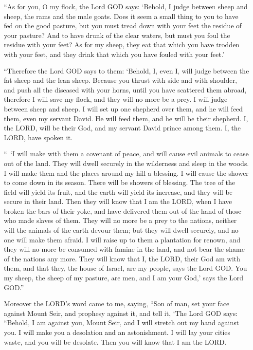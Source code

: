 \myverse{}“As for you, O my flock, the Lord GOD says: ‘Behold, I judge
between sheep and sheep, the rams and the male goats.
\myverse{}Does it seem a small thing to you to have fed on the good pasture, but you
must tread down with your feet the residue of your pasture? And to have drunk of the clear waters, but
must you foul the residue with your feet?
\myverse{}As for my sheep, they eat that which you have trodden with your feet, and
they drink that which you have fouled with your feet.’

\myverse{}“Therefore the Lord GOD says to them: ‘Behold, I, even I, will
judge between the fat sheep and the lean sheep.
\myverse{}Because you thrust with side and with shoulder, and push all the diseased
with your horns, until you have scattered them abroad,
\myverse{}therefore I will save my flock, and they will no more be a prey. I will judge
between sheep and sheep.
\myverse{}I will set up one shepherd over them, and he will feed them, even my servant
David. He will feed them, and he will be their shepherd.
\myverse{}I, the LORD, will be their God, and my servant David prince among them. I,
the LORD, have spoken it.

\myverse{}“ ‘I will make with them a covenant of peace, and will cause
evil animals to cease out of the land. They will dwell securely in the wilderness and sleep in the woods.
\myverse{}I will make them and the places around my hill a blessing. I will cause the
shower to come down in its season. There will be showers of blessing.
\myverse{}The tree of the field will yield its fruit, and the earth will yield its
increase, and they will be secure in their land. Then they will know that I am the LORD, when I have broken
the bars of their yoke, and have delivered them out of the hand of those who made slaves of them.
\myverse{}They will no more be a prey to the nations, neither will the animals of the
earth devour them; but they will dwell securely, and no one will make them afraid.
\myverse{}I will raise up to them a plantation for renown, and they will no more be
consumed with famine in the land, and not bear the shame of the nations any more.
\myverse{}They will know that I, the LORD, their God am with them, and that they, the
house of Israel, are my people, says the Lord GOD.
\myverse{}You my sheep, the sheep of my pasture, are men, and I am your God,’ says
the Lord GOD.”


\mychapter{} \myverse*{}Moreover the LORD’s word came to me, saying,
\myverse{}“Son of man, set your face against Mount Seir, and prophesy against it,
\myverse{}and tell it, ‘The Lord GOD says: “Behold, I am against you, Mount Seir, and
I will stretch out my hand against you. I will make you a desolation and an astonishment.
\myverse{}I will lay your cities waste, and you will be desolate. Then you will know
that I am the LORD.

